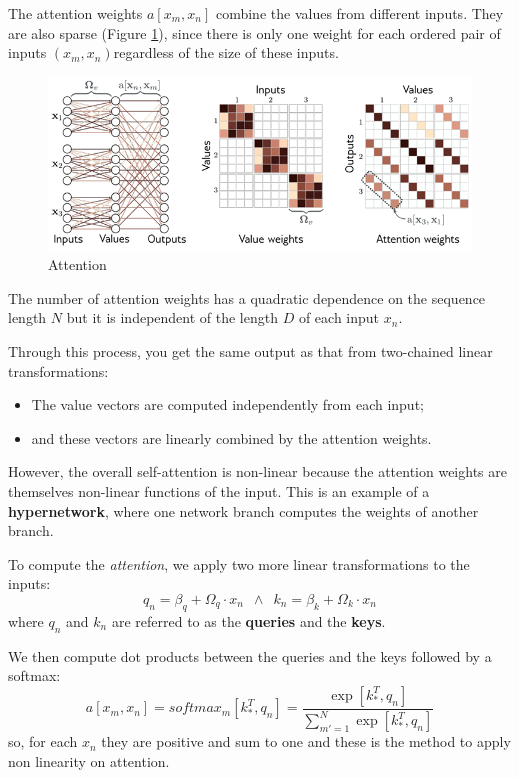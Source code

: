 The attention weights $a[x_m, x_n]$ combine the values from different inputs. They
are also sparse (Figure \ref{fig:attention}), since there is only one weight for
each ordered pair of inputs $(x_m, x_n)$regardless of the size of these inputs.

\begin{figure}[!ht]
    \centering
    \includegraphics[width=0.6\linewidth]{img/transformer/attention.png}
    \caption{Attention}
    \label{fig:attention}
\end{figure}

The number of attention weights has a quadratic dependence on the sequence length
$N$ but it is independent of the length $D$ of each input $x_n$.

Through this process, you get the same output as that from two-chained linear
transformations:
\begin{itemize}
    \item The value vectors are computed independently from each input;
    \item and these vectors are linearly combined by the attention weights.
\end{itemize}

However, the overall self-attention is non-linear because the attention weights
are themselves non-linear functions of the input. This is an example of a
\textbf{hypernetwork}, where one network branch computes the weights of another
branch.

To compute the \textit{attention}, we apply two more linear transformations to
the inputs:
\begin{equation}
    q_n = \beta_q + \Omega_q \cdot x_n \,\,\, \land \,\,\, k_n = \beta_k + \Omega_k \cdot x_n
\end{equation}
where $q_n$ and $k_n$ are referred to as the \textbf{queries} and the \textbf{keys}.

We then compute dot products between the queries and the keys followed by a softmax:
\begin{equation}
    a[x_m, x_n] = softmax_m [k_\ast^T, q_n] = \frac{\exp[k_\ast^T, q_n]}{\sum_{m' = 1}^N \exp[k_\ast^T, q_n]}
\end{equation}
so, for each $x_n$ they are positive and sum to one and these is the method to apply
non linearity on attention.

